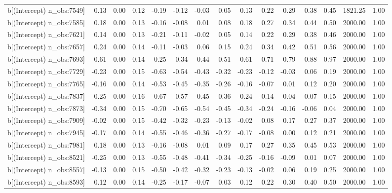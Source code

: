 \begin{table}[ht]
\begin{tabular}{rrrrrrrrrrrrrrr}
  b[(Intercept) n\_obs:7549] & 0.13 & 0.00 & 0.12 & -0.19 & -0.12 & -0.03 & 0.05 & 0.13 & 0.22 & 0.29 & 0.38 & 0.45 & 1821.25 & 1.00 \\ 
  b[(Intercept) n\_obs:7585] & 0.18 & 0.00 & 0.13 & -0.16 & -0.08 & 0.01 & 0.08 & 0.18 & 0.27 & 0.34 & 0.44 & 0.50 & 2000.00 & 1.00 \\ 
  b[(Intercept) n\_obs:7621] & 0.14 & 0.00 & 0.13 & -0.21 & -0.11 & -0.02 & 0.05 & 0.14 & 0.22 & 0.29 & 0.38 & 0.46 & 2000.00 & 1.00 \\ 
  b[(Intercept) n\_obs:7657] & 0.24 & 0.00 & 0.14 & -0.11 & -0.03 & 0.06 & 0.15 & 0.24 & 0.34 & 0.42 & 0.51 & 0.56 & 2000.00 & 1.00 \\ 
  b[(Intercept) n\_obs:7693] & 0.61 & 0.00 & 0.14 & 0.25 & 0.34 & 0.44 & 0.51 & 0.61 & 0.71 & 0.79 & 0.88 & 0.97 & 2000.00 & 1.00 \\ 
  b[(Intercept) n\_obs:7729] & -0.23 & 0.00 & 0.15 & -0.63 & -0.54 & -0.43 & -0.32 & -0.23 & -0.12 & -0.03 & 0.06 & 0.19 & 2000.00 & 1.00 \\ 
  b[(Intercept) n\_obs:7765] & -0.16 & 0.00 & 0.14 & -0.53 & -0.45 & -0.35 & -0.26 & -0.16 & -0.07 & 0.01 & 0.12 & 0.20 & 2000.00 & 1.00 \\ 
  b[(Intercept) n\_obs:7837] & -0.25 & 0.00 & 0.16 & -0.67 & -0.57 & -0.45 & -0.36 & -0.24 & -0.14 & -0.04 & 0.07 & 0.15 & 2000.00 & 1.00 \\ 
  b[(Intercept) n\_obs:7873] & -0.34 & 0.00 & 0.15 & -0.70 & -0.65 & -0.54 & -0.45 & -0.34 & -0.24 & -0.16 & -0.06 & 0.04 & 2000.00 & 1.00 \\ 
  b[(Intercept) n\_obs:7909] & -0.02 & 0.00 & 0.15 & -0.42 & -0.32 & -0.23 & -0.13 & -0.02 & 0.08 & 0.17 & 0.27 & 0.37 & 2000.00 & 1.00 \\ 
  b[(Intercept) n\_obs:7945] & -0.17 & 0.00 & 0.14 & -0.55 & -0.46 & -0.36 & -0.27 & -0.17 & -0.08 & 0.00 & 0.12 & 0.21 & 2000.00 & 1.00 \\ 
  b[(Intercept) n\_obs:7981] & 0.18 & 0.00 & 0.13 & -0.16 & -0.08 & 0.01 & 0.09 & 0.17 & 0.27 & 0.35 & 0.45 & 0.53 & 2000.00 & 1.00 \\ 
  b[(Intercept) n\_obs:8521] & -0.25 & 0.00 & 0.13 & -0.55 & -0.48 & -0.41 & -0.34 & -0.25 & -0.16 & -0.09 & 0.01 & 0.07 & 2000.00 & 1.00 \\ 
  b[(Intercept) n\_obs:8557] & -0.13 & 0.00 & 0.15 & -0.50 & -0.42 & -0.32 & -0.23 & -0.13 & -0.02 & 0.06 & 0.19 & 0.25 & 2000.00 & 1.00 \\ 
  b[(Intercept) n\_obs:8593] & 0.12 & 0.00 & 0.14 & -0.25 & -0.17 & -0.07 & 0.03 & 0.12 & 0.22 & 0.30 & 0.40 & 0.50 & 2000.00 & 1.00 \\ 

\end{tabular}
\end{table}
